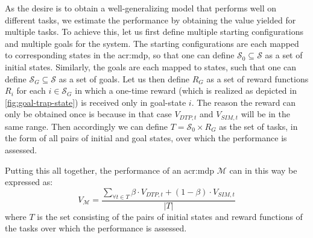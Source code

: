 As the desire is to obtain a well-generalizing model that performs well on different tasks, we estimate the performance by obtaining the value yielded for multiple tasks.
To achieve this, let us first define multiple starting configurations and multiple goals for the system.
The starting configurations are each mapped to corresponding states in the \acrshort{acr:mdp}, so that one can define $\mathcal{S}_0 \subseteq \mathcal{S}$ as a set of initial states.
Similarly, the goals are each mapped to states, such that one can define $\mathcal{S}_G \subseteq \mathcal{S}$ as a set of goals.
Let us then define $R_G$ as a set of reward functions $R_i$ for each $i \in \mathcal{S}_G$ in which a one-time reward (which is realized as depicted in \autoref{fig:goal-trap-state}) is received only in goal-state $i$.
The reason the reward can only be obtained once is because in that case $V_{\mathit{DTP}, t}$ and $V_{\mathit{SIM}, t}$ will be in the same range.
Then accordingly we can define $T = \mathcal{S_0} \times R_G$ as the set of tasks, in the form of all pairs of initial and goal states, over which the performance is assessed.

\noindent Putting this all together, the performance of an \acrshort{acr:mdp} $\mathcal{M}$ can in this way be expressed as:
\begin{equation}
\label{eq:vm}
	V_{\mathcal{M}} = \frac{\sum_{\forall t \in T} \beta \cdot V_{\mathit{DTP}, t} + (1 - \beta) \cdot V_{\mathit{SIM}, t}}{|T|}
\end{equation}
where $T$ is the set consisting of the pairs of initial states and reward functions of the tasks over which the performance is assessed.


%

